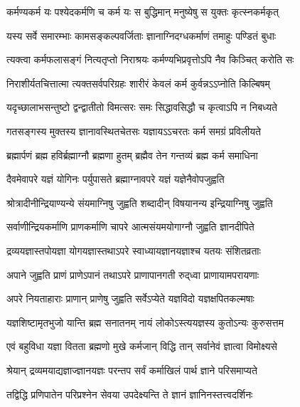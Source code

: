 \twolineshloka
{कर्मण्यकर्म यः पश्येदकर्मणि च कर्म यः}
{स बुद्धिमान् मनुष्येषु स युक्तः कृत्स्नकर्मकृत्}%

\twolineshloka
{यस्य सर्वे समारम्भाः कामसङ्कल्पवर्जिताः}
{ज्ञानाग्निदग्धकर्माणं तमाहुः पण्डितं बुधाः}%

\twolineshloka
{त्यक्त्वा कर्मफलासङ्गं नित्यतृप्तो निराश्रयः}
{कर्मण्यभिप्रवृत्तोऽपि नैव किञ्चित् करोति सः}%

\twolineshloka
{निराशीर्यतचित्तात्मा त्यक्तसर्वपरिग्रहः}
{शारीरं केवलं कर्म कुर्वन्नऽऽप्नोति किल्बिषम्}%

\twolineshloka
{यदृच्छालाभसन्तुष्टो द्वन्द्वातीतो विमत्सरः}
{समः सिद्धावसिद्धौ च कृत्वाऽपि न निबध्यते}%

\twolineshloka
{गतसङ्गस्य मुक्तस्य ज्ञानावस्थितचेतसः}
{यज्ञायऽऽचरतः कर्म समग्रं प्रविलीयते}%

\twolineshloka
{ब्रह्मार्पणं ब्रह्म हविर्ब्रह्माग्नौ ब्रह्मणा हुतम्}
{ब्रह्मैव तेन गन्तव्यं ब्रह्म कर्म समाधिना}%

\twolineshloka
{दैवमेवापरे यज्ञं योगिनः पर्युपासते}
{ब्रह्माग्नावपरे यज्ञं यज्ञेनैवोपजुह्वति}%

\twolineshloka
{श्रोत्रादीनीन्द्रियाण्यन्ये संयमाग्निषु जुह्वति}
{शब्दादीन् विषयानन्य इन्द्रियाग्निषु जुह्वति}%

\twolineshloka
{सर्वाणीन्द्रियकर्माणि प्राणकर्माणि चापरे}
{आत्मसंयमयोगाग्नौ जुह्वति ज्ञानदीपिते}%

\twolineshloka
{द्रव्ययज्ञास्तपोयज्ञा योगयज्ञास्तथाऽपरे}
{स्वाध्यायज्ञानयज्ञाश्च यतयः संशितव्रताः}%

\twolineshloka
{अपाने जुह्वति प्राणं प्राणेऽपानं तथाऽपरे}
{प्राणापानगती रुद्‌ध्वा प्राणायामपरायणाः}%

\twolineshloka
{अपरे नियताहाराः प्राणान् प्राणेषु जुह्वति}
{सर्वेऽप्येते यज्ञविदो यज्ञक्षपितकल्मषाः}%

\twolineshloka
{यज्ञशिष्टामृतभुजो यान्ति ब्रह्म सनातनम्}
{नायं लोकोऽस्त्ययज्ञस्य कुतोऽन्यः कुरुसत्तम}%

\twolineshloka
{एवं बहुविधा यज्ञा वितता ब्रह्मणो मुखे}
{कर्मजान् विद्धि तान् सर्वानेवं ज्ञात्वा विमोक्ष्यसे}%

\twolineshloka
{श्रेयान् द्रव्यमयाद्यज्ञाज्ज्ञानयज्ञः परन्तप}
{सर्वं कर्माखिलं पार्थ ज्ञाने परिसमाप्यते}%

\twolineshloka
{तद्विद्धि प्रणिपातेन परिप्रश्नेन सेवया}
{उपदेक्ष्यन्ति ते ज्ञानं ज्ञानिनस्तत्त्वदर्शिनः}%

